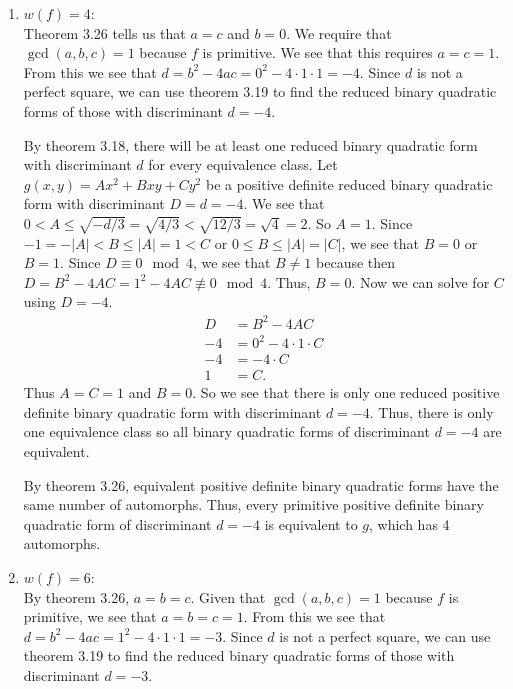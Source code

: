 \documentclass[12 pt]{amsart}
\begin{document}
  \begin{enumerate}
    \item $w(f) = 4$: \\
      Theorem 3.26 tells us that $a = c$ and $b = 0$.
      We require that $\gcd(a,b,c) = 1$ because $f$ is primitive.
      We see that this requires $a = c = 1$.
      From this we see that 
      $d = b^2 - 4ac = 0^2 - 4\cdot 1 \cdot 1 = -4$.
      Since $d$ is not a perfect square, we can use theorem 3.19
      to find the reduced binary quadratic forms of those with
      discriminant $d = -4$.

      By theorem 3.18, there will be at least one reduced 
      binary quadratic form with discriminant $d$
      for every equivalence class.
      Let $g(x,y) = Ax^2 + Bxy + Cy^2$ be a positive definite reduced binary 
      quadratic form with discriminant $D = d = -4$.
      We see that $0 < A \leq \sqrt{-d/3} = \sqrt{4/3} < \sqrt{12/3} = \sqrt{4} = 2$.
      So $A = 1$.
      Since $-1 = -|A| < B \leq |A| = 1 < C$ or 
      $0 \leq B \leq |A| = |C|$, we see that $B = 0$ or $B = 1$.
      Since $D \equiv 0 \mod 4$, we see that $B \neq 1$ because then
      $D = B^2 - 4AC = 1^2 - 4AC \not \equiv 0 \mod 4$.
      Thus, $B = 0$.
      Now we can solve for $C$ using $D = -4$.
      \begin{align*}
        D &= B^2 - 4AC \\
        -4 &= 0^2 - 4 \cdot 1 \cdot C \\
        -4 &= -4 \cdot C \\
        1 &= C.
      \end{align*}
      Thus $A = C = 1$ and $B = 0$.
      So we see that there is only one reduced positive definite binary
      quadratic form with discriminant $d = -4$. 
      Thus, there is only one equivalence class so all 
      binary quadratic forms of discriminant $d = -4$ are
      equivalent.

      By theorem 3.26, equivalent positive definite binary quadratic
      forms have the same number of automorphs.
      Thus, every primitive positive definite binary quadratic form
      of discriminant $d = -4$
      is equivalent to $g$, which has 4 automorphs.
    \item $w(f) = 6$: \\
      By theorem 3.26, $a = b = c$.
      Given that $\gcd(a,b,c) = 1$ because $f$ is primitive, 
      we see that $a = b = c = 1$.
      From this we see that 
      $d = b^2 - 4ac = 1^2 - 4\cdot 1 \cdot 1 = -3$.
      Since $d$ is not a perfect square, we can use theorem 3.19
      to find the reduced binary quadratic forms of those with
      discriminant $d = -3$.


\end{enumerate}
\end{document}
